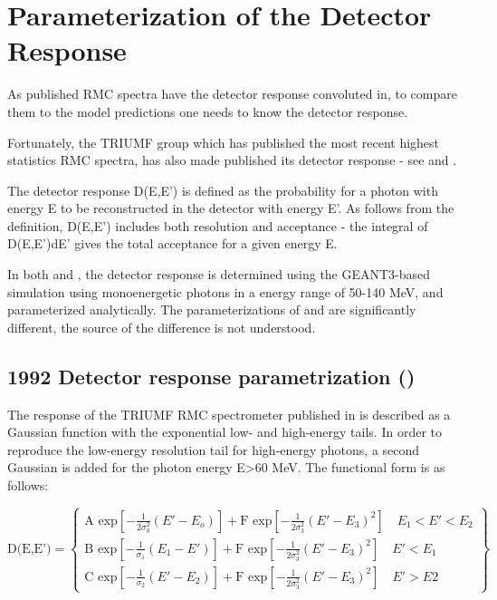 \section { Parameterization of the Detector Response}

As published RMC spectra have the detector response convoluted in, to compare
them to the model predictions one needs to know the detector response.

Fortunately, the TRIUMF group which has published the most recent highest statistics
RMC spectra, has also made published its detector response -
see \cite{RMC_1992_PhysRevC.46.1094} and \cite{RMC_1998_PhysRevC.58.1767}. 

The detector response D(E,E') is defined as the probability for a photon
with energy E to be reconstructed in the detector with energy E'. As follows from the
definition, D(E,E') includes both resolution and acceptance - the integral of D(E,E')dE'
gives the total acceptance for a given energy E.

In both \cite{RMC_1992_PhysRevC.46.1094} and \cite{RMC_1998_PhysRevC.58.1767}, the
detector response is determined using the GEANT3-based simulation using monoenergetic
photons in a energy range of 50-140 MeV, and parameterized analytically.
The parameterizations of  \cite{RMC_1992_PhysRevC.46.1094} and \cite{RMC_1998_PhysRevC.58.1767}
are significantly different, the source of the difference is not understood.

\subsection { 1992 Detector response parametrization (\cite{RMC_1992_PhysRevC.46.1094})}

The response of the TRIUMF RMC spectrometer published in \cite{RMC_1992_PhysRevC.46.1094}
is described as a Gaussian function with the exponential low- and  high-energy tails.
In order to reproduce the low-energy resolution tail for high-energy photons, a second Gaussian
is added for the photon energy E>60 MeV. The functional form is as follows:

\begin{equation}
  \label{eq:001}
\text{D(E,E')}= \left\{
\begin{array}{ll}
                \text{A exp}\left[-\frac{1}{2\sigma_0^2}(E'-E_o)\right]+
                \text{F exp}\left[-\frac{1}{2\sigma_3^2}(E'-E_3)^2\right]
 \quad E_1<E'<E_2 \\
                \text{B exp}\left[-\frac{1}{\sigma_1}(E_1-E') \right]+
                \text{F exp}\left[-\frac{1}{2\sigma_3^2}(E'-E_3)^2\right]
 \quad E'<E_1      \\  
                \text{C exp}\left[-\frac{1}{\sigma_2}(E'-E_2)\right]+
                \text{F exp}\left[-\frac{1}{2\sigma_3^2}(E'-E_3)^2\right]
 \quad E'>E2     
 \end{array}
 \right\}
\end{equation}
 
